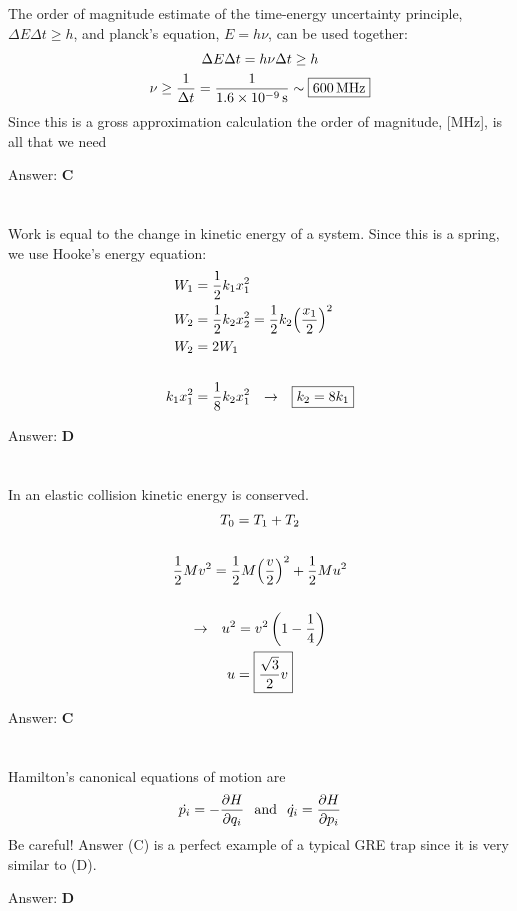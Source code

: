 \documentclass[12pt]{article}
\newcommand{\Answer}[1]{Answer: \textbf{#1}}
\newcommand{\Problem}[3]{
    \setcounter{section}{#1}
    \addtocounter{section}{-1}
    \section{}
    #3\par\par
    \Answer{#2}
}
\begin{document}
\Problem{27}{C}{%
The order of magnitude estimate  of the time-energy uncertainty principle, $\Delta E \Delta t \geq h$, and planck's equation, $E = h \nu$, can be used together:
\begin{gather}
\Delta E \Delta t = h \nu \Delta t \geq h\nonumber\\
\nu \geq \frac{1}{\Delta t} = \frac{1}{1.6\times 10^{-9}\,\text{s}} \sim \boxed{600\,\text{MHz}}\nonumber
\end{gather}
Since this is a gross approximation calculation the order of magnitude, [MHz], is all that we need
}

\Problem{28}{D}{%
Work is equal to the change in kinetic energy of a system. Since this is a spring, we use Hooke's energy equation:
\begin{align}
W_{1} &= \frac{1}{2}k_{1}x_{1}^{2}\nonumber\\
W_{2} &= \frac{1}{2}k_{2}x_{2}^{2} = \frac{1}{2}k_2 {\left(\frac{x_1}{2}\right)}^{2}\nonumber\\
W_{2} &= 2W_{1}\nonumber\\
\nonumber\\
k_{1}x_{1}^{2} &= \frac{1}{8}k_{2} x_{1}^{2} \hspace{.1in} \rightarrow \hspace{.1in} \boxed{k_{2} = 8k_{1}}\nonumber
\end{align}
}

\Problem{29}{C}{%
In an elastic collision kinetic energy is conserved.
\begin{gather}
T_{0} = T_{1} +T_{2}\nonumber\\
\nonumber\\
\frac{1}{2}Mv^2 = \frac{1}{2}M{\left(\frac{v}{2}\right)}^{2} + \frac{1}{2}Mu^{2}\nonumber\\\nonumber\\
\rightarrow \hspace{.1in} u^2 = v^2\left(1-\frac{1}{4}\right)\nonumber\\
u = \boxed{\frac{\sqrt{3}}{2}v}\nonumber
\end{gather}
}


\Problem{30}{D}{%
Hamilton's canonical equations of motion are
\begin{align}
\dot{p_{i}} = -\frac{\partial H}{\partial q_{i}} \hspace{.1in} \text{and} \hspace{.1in} \dot{q_{i}} = \frac{\partial H}{\partial p_{i}}
\end{align}
Be careful! Answer (C) is a perfect example of a typical GRE trap since it is very similar to (D).
}
\end{document}
